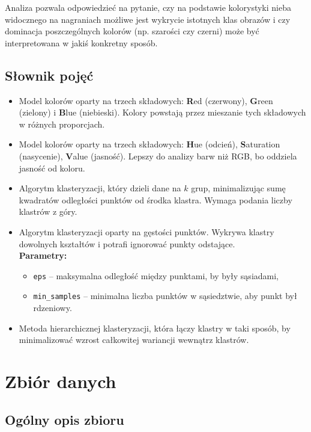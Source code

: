\documentclass[12pt]{article}
\begin{document}
Analiza pozwala odpowiedzieć na pytanie, czy na podstawie kolorystyki nieba widocznego na nagraniach możliwe jest wykrycie istotnych klas obrazów i czy dominacja poszczególnych kolorów (np. szarości czy czerni) może być interpretowana w jakiś konkretny sposób.

\subsection{Słownik pojęć}

\begin{itemize}
    \item[RGB] Model kolorów oparty na trzech składowych: \textbf{R}ed (czerwony), \textbf{G}reen (zielony) i \textbf{B}lue (niebieski). Kolory powstają przez mieszanie tych składowych w różnych proporcjach.

    \item[HSV] Model kolorów oparty na trzech składowych: \textbf{H}ue (odcień), \textbf{S}aturation (nasycenie), \textbf{V}alue (jasność). Lepszy do analizy barw niż RGB, bo oddziela jasność od koloru.

    \item[KMeans] Algorytm klasteryzacji, który dzieli dane na \(k\) grup, minimalizując sumę kwadratów odległości punktów od środka klastra. Wymaga podania liczby klastrów z góry.

    \item[DBSCAN] Algorytm klasteryzacji oparty na gęstości punktów. Wykrywa klastry dowolnych kształtów i potrafi ignorować punkty odstające.\\
          \textbf{Parametry:}
          \begin{itemize}
              \item \texttt{eps} – maksymalna odległość między punktami, by były sąsiadami,
              \item \texttt{min\_samples} – minimalna liczba punktów w sąsiedztwie, aby punkt był rdzeniowy.
          \end{itemize}

    \item[Ward] Metoda hierarchicznej klasteryzacji, która łączy klastry w taki sposób, by minimalizować wzrost całkowitej wariancji wewnątrz klastrów.\end{itemize}

\section{Zbiór danych}
\subsection{Ogólny opis zbioru}
\end{document}
